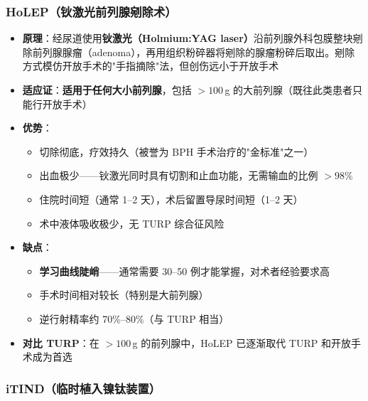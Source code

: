\subsubsection{HoLEP（钬激光前列腺剜除术）}

\begin{itemize}[leftmargin=2cm]
	\item \textbf{原理}：经尿道使用\textbf{钬激光（Holmium:YAG laser）}沿前列腺外科包膜整块剜除前列腺腺瘤（adenoma），再用组织粉碎器将剜除的腺瘤粉碎后取出。剜除方式模仿开放手术的"手指摘除"法，但创伤远小于开放手术
	\item \textbf{适应证}：\textbf{适用于任何大小前列腺}，包括 $>100$\,g 的大前列腺（既往此类患者只能行开放手术）
	\item \textbf{优势}：
	\begin{itemize}
		\item 切除彻底，疗效持久（被誉为 BPH 手术治疗的"金标准"之一）
		\item 出血极少——钬激光同时具有切割和止血功能，无需输血的比例 $>98\%$
		\item 住院时间短（通常 1--2 天），术后留置导尿时间短（1--2 天）
		\item 术中液体吸收极少，无 TURP 综合征风险
	\end{itemize}
	\item \textbf{缺点}：
	\begin{itemize}
		\item \textbf{学习曲线陡峭}——通常需要 30--50 例才能掌握，对术者经验要求高
		\item 手术时间相对较长（特别是大前列腺）
		\item 逆行射精率约 70\%--80\%（与 TURP 相当）
	\end{itemize}
	\item \textbf{对比 TURP}：在 $>100$\,g 的前列腺中，HoLEP 已逐渐取代 TURP 和开放手术成为首选
\end{itemize}

\subsubsection{iTIND（临时植入镍钛装置）}

